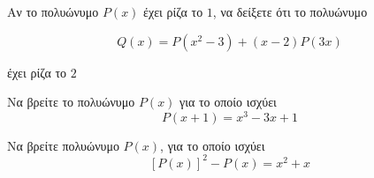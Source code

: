 \documentclass{../presentation}
\begin{document}
\begin{askisi}
  Αν το πολυώνυμο $P(x)$ έχει ρίζα το $1$, να δείξετε ότι το πολυώνυμο

  $$Q(x)=P(x^2-3)+(x-2)P(3x)$$

  έχει ρίζα το $2$

\end{askisi}

\begin{askisi}
  Να βρείτε το πολυώνυμο $P(x)$ για το οποίο ισχύει
  $$P(x+1)=x^3-3x+1$$

\end{askisi}

\begin{askisi}
  Να βρείτε πολυώνυμο $P(x)$, για το οποίο ισχύει
  $$\left[ P(x) \right]^2-P(x)=x^2+x$$
\end{askisi}
\end{document}
